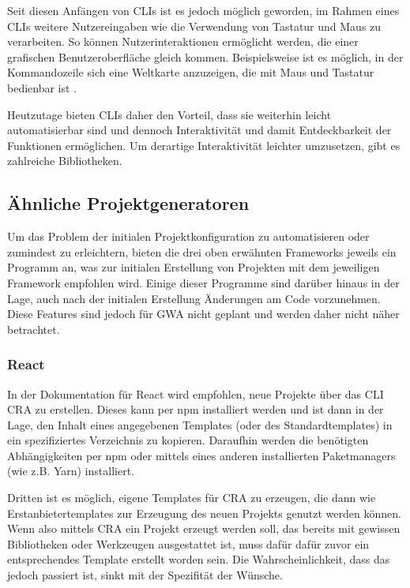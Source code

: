 Seit diesen Anfängen von \gls{CLI}s ist es jedoch möglich geworden, im Rahmen eines \gls{CLI}s weitere Nutzereingaben wie die Verwendung von Tastatur und Maus zu verarbeiten. So können Nutzerinteraktionen ermöglicht werden, die einer grafischen Benutzeroberfläche gleich kommen. Beispielsweise ist es möglich, in der Kommandozeile sich eine Weltkarte anzuzeigen, die mit Maus und Tastatur bedienbar ist \cite{mapscii}.

Heutzutage bieten \gls{CLI}s daher den Vorteil, dass sie weiterhin leicht automatisierbar sind und dennoch Interaktivität und damit Entdeckbarkeit der Funktionen ermöglichen. Um derartige Interaktivität leichter umzusetzen, gibt es zahlreiche Bibliotheken.

\subsection{Ähnliche Projektgeneratoren}
Um das Problem der initialen Projektkonfiguration zu automatisieren oder zumindest zu erleichtern, bieten die drei oben erwähnten Frameworks jeweils ein Programm an, was zur initialen Erstellung von Projekten mit dem jeweiligen Framework empfohlen wird. Einige dieser Programme sind darüber hinaus in der Lage, auch nach der initialen Erstellung Änderungen am Code vorzunehmen. Diese Features sind jedoch für \gls{GWA} nicht geplant und werden daher nicht näher betrachtet.

\subsubsection{React}
In der Dokumentation für React wird empfohlen, neue Projekte über das \gls{CLI} \gls{CRA} zu erstellen. Dieses kann per \gls{npm} installiert werden und ist dann in der Lage, den Inhalt eines angegebenen Templates (oder des Standardtemplates) in ein spezifiziertes Verzeichnis zu kopieren. Daraufhin werden die benötigten Abhängigkeiten per \gls{npm} oder mittels eines anderen installierten Paketmanagers (wie z.B. Yarn) installiert.

Dritten ist es möglich, eigene Templates für \gls{CRA} zu erzeugen, die dann wie Erstanbietertemplates zur Erzeugung des neuen Projekts genutzt werden können. Wenn also mittels \gls{CRA} ein Projekt erzeugt werden soll, das bereits mit gewissen Bibliotheken oder Werkzeugen ausgestattet ist, muss dafür dafür zuvor ein entsprechendes Template erstellt worden sein. Die Wahrscheinlichkeit, dass das jedoch passiert ist, sinkt mit der Spezifität der Wünsche.


